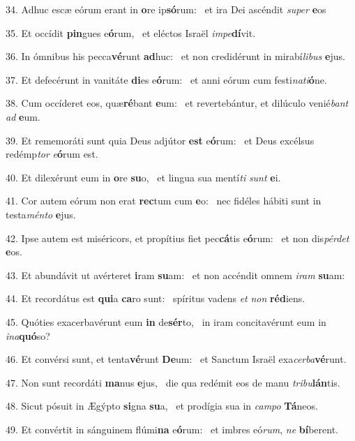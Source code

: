 34. Adhuc escæ eórum erant in \textbf{o}re ip\textbf{só}rum: \ast\  et ira Dei ascéndit \textit{su}\textit{per} \textbf{e}os\

35. Et occídit \textbf{pin}gues e\textbf{ó}rum, \ast\  et eléctos Israël \textit{im}\textit{pe}\textbf{dí}vit.\

36. In ómnibus his pecca\textbf{vé}runt \textbf{ad}huc: \ast\  et non credidérunt in mirabí\textit{li}\textit{bus} \textbf{e}jus.\

37. Et defecérunt in vanitáte \textbf{di}es e\textbf{ó}rum: \ast\  et anni eórum cum festi\textit{na}\textit{ti}\textbf{ó}ne.\

38. Cum occíderet eos, quæ\textbf{ré}bant \textbf{e}um: \ast\  et revertebántur, et dilúculo venié\textit{bant} \textit{ad} \textbf{e}um.\

39. Et rememoráti sunt quia Deus adjútor \textbf{est} e\textbf{ó}rum: \ast\  et Deus excélsus redémp\textit{tor} \textit{e}\textbf{ó}rum est.\

40. Et dilexérunt eum in \textbf{o}re \textbf{su}o, \ast\  et lingua sua mentí\textit{ti} \textit{sunt} \textbf{e}i.\

41. Cor autem eórum non erat \textbf{rec}tum cum \textbf{e}o: \ast\  nec fidéles hábiti sunt in testa\textit{mén}\textit{to} \textbf{e}jus.\

42. Ipse autem est miséricors, et propítius fiet pec\textbf{cá}tis e\textbf{ó}rum: \ast\  et non dis\textit{pér}\textit{det} \textbf{e}os.\

43. Et abundávit ut avérteret \textbf{i}ram \textbf{su}am: \ast\  et non accéndit omnem \textit{i}\textit{ram} \textbf{su}am:\

44. Et recordátus est \textbf{qui}a \textbf{ca}ro sunt: \ast\  spíritus vadens \textit{et} \textit{non} \textbf{réd}iens.\

45. Quóties exacerbavérunt eum \textbf{in} de\textbf{sér}to, \ast\  in iram concitavérunt eum in \textit{in}\textit{a}\textbf{quó}so?\

46. Et convérsi sunt, et tenta\textbf{vé}runt \textbf{De}um: \ast\  et Sanctum Israël exa\textit{cer}\textit{ba}\textbf{vé}runt.\

47. Non sunt recordáti \textbf{ma}nus \textbf{e}jus, \ast\  die qua redémit eos de manu \textit{tri}\textit{bu}\textbf{lán}tis.\

48. Sicut pósuit in Ægýpto \textbf{si}gna \textbf{su}a, \ast\  et prodígia sua in \textit{cam}\textit{po} \textbf{Tá}neos.\

49. Et convértit in sánguinem flúmi\textbf{na} e\textbf{ó}rum: \ast\  et imbres eó\textit{rum}, \textit{ne} \textbf{bí}berent.\

